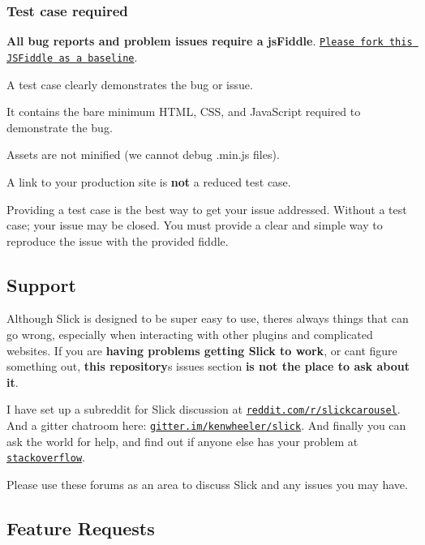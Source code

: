\subsubsection*{Test case required}

{\bfseries All bug reports and problem issues require a js\+Fiddle}. \href{http://jsfiddle.net/simeydotme/fmo50w7n/}{\tt Please fork this J\+S\+Fiddle as a baseline}.


\begin{DoxyItemize}
\item A test case clearly demonstrates the bug or issue.
\item It contains the bare minimum H\+T\+ML, C\+SS, and Java\+Script required to demonstrate the bug.
\item Assets are not minified (we cannot debug .min.\+js files).
\item A link to your production site is {\bfseries not} a reduced test case.
\end{DoxyItemize}

Providing a test case is the best way to get your issue addressed. Without a test case; your issue may be closed. You must provide a clear and simple way to reproduce the issue with the provided fiddle.

\subsection*{Support}

Although Slick is designed to be super easy to use, there\textquotesingle{}s always things that can go wrong, especially when interacting with other plugins and complicated websites. If you are {\bfseries having problems getting Slick to work}, or can\textquotesingle{}t figure something out, {\bfseries this repository}\textquotesingle{}s issues section {\bfseries is not the place to ask about it}.

I have set up a subreddit for Slick discussion at \href{http://www.reddit.com/r/slickcarousel/}{\tt reddit.\+com/r/slickcarousel}. And a gitter chatroom here\+: \href{https://gitter.im/kenwheeler/slick}{\tt gitter.\+im/kenwheeler/slick}. And finally you can ask the world for help, and find out if anyone else has your problem at \href{http://stackoverflow.com/search?q=slick+carousel}{\tt stackoverflow}.

Please use these forums as an area to discuss Slick and any issues you may have.

\subsection*{Feature Requests}

